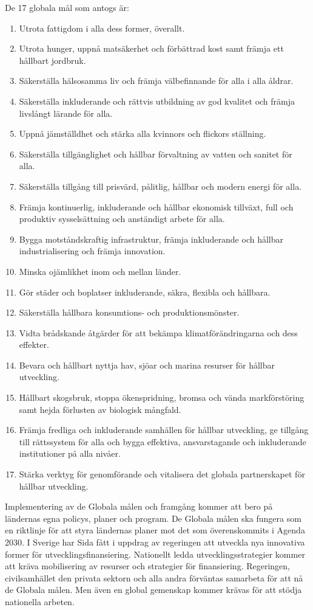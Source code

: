 \documentclass{report}
\begin{document}
 De 17 globala mål som antogs är: 
\begin{enumerate}
\item Utrota fattigdom i alla dess former, överallt.
\item Utrota hunger, uppnå matsäkerhet och förbättrad kost samt främja ett hållbart jordbruk.
\item Säkerställa hälsosamma liv och främja välbefinnande för alla i alla åldrar.
\item Säkerställa inkluderande och rättvis utbildning av god kvalitet och främja livslångt lärande för alla.
\item Uppnå jämställdhet och stärka alla kvinnors och flickors ställning.
\item Säkerställa tillgänglighet och hållbar förvaltning av vatten och sanitet för alla.
\item Säkerställa tillgång till prisvärd, pålitlig, hållbar och modern energi för alla.
\item Främja kontinuerlig, inkluderande och hållbar ekonomisk tillväxt, full och produktiv sysselsättning och anständigt arbete för alla.
\item Bygga motståndskraftig infrastruktur, främja inkluderande och hållbar industrialisering och främja innovation.
\item Minska ojämlikhet inom och mellan länder.
\item Gör städer och boplatser inkluderande, säkra, flexibla och hållbara.
\item Säkerställa hållbara konsumtions- och produktionsmönster.
\item Vidta brådskande åtgärder för att bekämpa klimatförändringarna och dess effekter.
\item Bevara och hållbart nyttja hav, sjöar och marina resurser för hållbar utveckling.
\item Hållbart skogsbruk, stoppa ökenspridning, bromsa och vända markförstöring samt hejda förlusten av biologisk mångfald.
\item Främja fredliga och inkluderande samhällen för hållbar utveckling, ge tillgång till rättssystem för alla och bygga effektiva, ansvarstagande och inkluderande institutioner på alla nivåer.
\item Stärka verktyg för genomförande och vitalisera det globala partnerskapet för hållbar utveckling. \cite{webKTH}
\end{enumerate}



Implementering av de Globala målen och framgång kommer att bero på ländernas egna policys, planer och program. De Globala målen ska fungera som en riktlinje för att styra ländernas planer mot det som överenskommits i Agenda 2030. \cite{web2030agenda}
I Sverige har Sida fått i uppdrag av regeringen att utveckla nya innovativa former för utvecklingsfinansiering. \cite{webSIDA}
Nationellt ledda utvecklingsstrategier kommer att kräva mobilisering av resurser och strategier för finansiering. Regeringen, civilsamhället den privata sektorn och alla andra förväntas samarbeta för att nå de Globala målen. Men även en global gemenskap kommer krävas för att stödja nationella arbeten.\\
\end{document}
